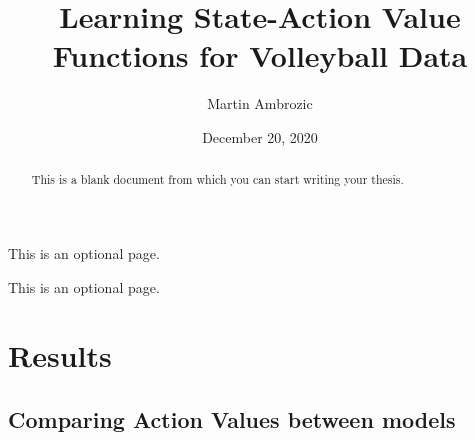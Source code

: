 \documentclass{sfuthesis}
\title{Learning State-Action Value Functions for Volleyball Data}
\author{Martin Ambrozic}
\date{December 20, 2020}
\begin{document}
\frontmatter
\maketitle{}
\makecommittee{}

\begin{abstract}
	This is a blank document from which you can start writing your thesis.
\end{abstract}


\begin{dedication}
	This is an optional page.
\end{dedication}


\begin{acknowledgements}
	This is an optional page.
\end{acknowledgements}

%
\tableofcontents%
\clearpage

%
\listoftables%
\clearpage

%
\listoffigures%
\clearpage





%
%

\mainmatter%




\chapter{Results}

\section{Comparing Action Values between models}
\end{document}
